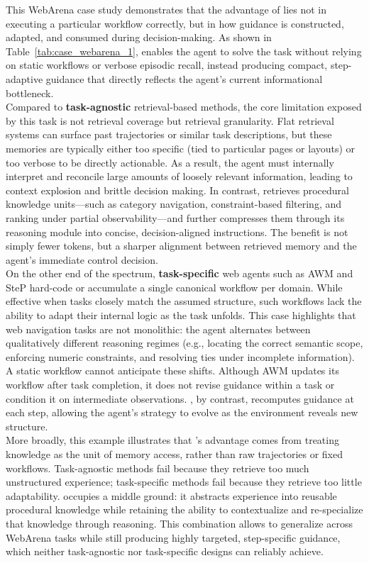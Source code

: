 This WebArena case study demonstrates that the advantage of \plugmem lies not in executing a particular workflow correctly, but in how guidance is constructed, adapted, and consumed during decision-making. As shown in Table~\ref{tab:case_webarena_1}, \plugmem enables the agent to solve the task without relying on static workflows or verbose episodic recall, instead producing compact, step-adaptive guidance that directly reflects the agent’s current informational bottleneck.\\
Compared to \textbf{task-agnostic} retrieval-based methods, the core limitation exposed by this task is not retrieval coverage but retrieval granularity. Flat retrieval systems can surface past trajectories or similar task descriptions, but these memories are typically either too specific (tied to particular pages or layouts) or too verbose to be directly actionable. As a result, the agent must internally interpret and reconcile large amounts of loosely relevant information, leading to context explosion and brittle decision making. In contrast, \plugmem retrieves procedural knowledge units—such as category navigation, constraint-based filtering, and ranking under partial observability—and further compresses them through its reasoning module into concise, decision-aligned instructions. The benefit is not simply fewer tokens, but a sharper alignment between retrieved memory and the agent’s immediate control decision.\\
On the other end of the spectrum, \textbf{task-specific} web agents such as AWM and SteP hard-code or accumulate a single canonical workflow per domain. While effective when tasks closely match the assumed structure, such workflows lack the ability to adapt their internal logic as the task unfolds. This case highlights that web navigation tasks are not monolithic: the agent alternates between qualitatively different reasoning regimes (e.g., locating the correct semantic scope, enforcing numeric constraints, and resolving ties under incomplete information). A static workflow cannot anticipate these shifts. Although AWM updates its workflow after task completion, it does not revise guidance within a task or condition it on intermediate observations. \plugmem, by contrast, recomputes guidance at each step, allowing the agent’s strategy to evolve as the environment reveals new structure.\\
More broadly, this example illustrates that \plugmem’s advantage comes from treating knowledge as the unit of memory access, rather than raw trajectories or fixed workflows. Task-agnostic methods fail because they retrieve too much unstructured experience; task-specific methods fail because they retrieve too little adaptability. \plugmem occupies a middle ground: it abstracts experience into reusable procedural knowledge while retaining the ability to contextualize and re-specialize that knowledge through reasoning. This combination allows \plugmem to generalize across WebArena tasks while still producing highly targeted, step-specific guidance, which neither task-agnostic nor task-specific designs can reliably achieve.


